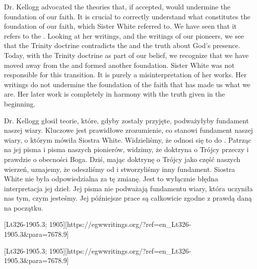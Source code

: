 Dr. Kellogg advocated the theories that, if accepted, would undermine the foundation of our faith. It is crucial to correctly understand what constitutes the foundation of our faith, which Sister White referred to. We have seen that it refers to the . Looking at her writings, and the writings of our pioneers, we see that the Trinity doctrine contradicts the  and the truth about God’s presence. Today, with the Trinity doctrine as part of our belief, we recognize that we have moved away from the  and formed another foundation. Sister White was not responsible for this transition. It is purely a misinterpretation of her works. Her writings do not undermine the foundation of the faith that has made us what we are. Her later work is completely in harmony with the truth given in the beginning.


Dr. Kellogg głosił teorie, które, gdyby zostały przyjęte, podważyłyby fundament naszej wiary. Kluczowe jest prawidłowe zrozumienie, co stanowi fundament naszej wiary, o którym mówiła Siostra White. Widzieliśmy, że odnosi się to do . Patrząc na jej pisma i pisma naszych pionierów, widzimy, że doktryna o Trójcy przeczy  i prawdzie o obecności Boga. Dziś, mając doktrynę o Trójcy jako część naszych wierzeń, uznajemy, że odeszliśmy od  i stworzyliśmy inny fundament. Siostra White nie była odpowiedzialna za tę zmianę. Jest to wyłącznie błędna interpretacja jej dzieł. Jej pisma nie podważają fundamentu wiary, która uczyniła nas tym, czym jesteśmy. Jej późniejsze prace są całkowicie zgodne z prawdą daną na początku.


[Lt326-1905.3; 1905][https://egwwritings.org/?ref=en\_Lt326-1905.3&para=7678.9]


[Lt326-1905.3; 1905][https://egwwritings.org/?ref=en\_Lt326-1905.3&para=7678.9]


